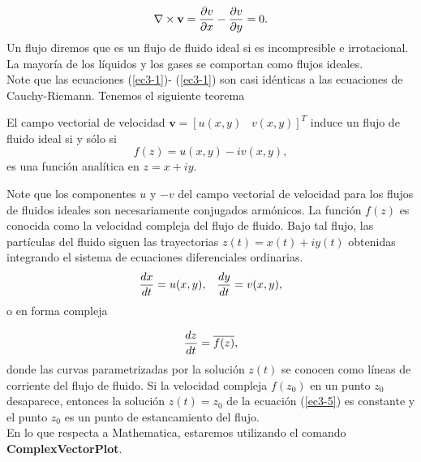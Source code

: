 \begin{equation}\label{ec3-2}
	\nabla \times \textbf{v} =\dfrac{\partial v}{\partial x}-\dfrac{\partial v}{\partial y}=0.
\end{equation}
Un flujo diremos que es un flujo de fluido ideal si es incompresible e irrotacional. La mayoría de los líquidos y los gases se comportan como flujos ideales.\\
Note que las ecuaciones (\ref{ec3-1})- (\ref{ec3-1}) son casi idénticas a las ecuaciones de Cauchy-Riemann. Tenemos el siguiente teorema
\begin{teor}
	El campo vectorial de velocidad $\textbf{v}=[u(x,y)\;\;\; v(x,y)]^{T}$ induce un flujo de fluido ideal si y sólo si
	\begin{equation}\label{ec3-3}
		f(z)=u(x,y)-iv(x,y),
	\end{equation}
	es una función analítica en $z=x+iy$.\endproof
\end{teor}
Note que los componentes $u$ y $-v$ del campo vectorial de velocidad para los flujos de fluidos ideales son necesariamente conjugados armónicos. La función $f(z)$ es conocida como la velocidad compleja del flujo de fluido. Bajo tal flujo, las partículas del fluido siguen las trayectorias $z(t) = x(t)+iy(t)$ obtenidas integrando el sistema de ecuaciones diferenciales ordinarias.
\begin{equation}\label{ec3-4}
	\dfrac{dx}{dt}=u(x,y),\; \; \; \dfrac{dy}{dt}=v(x,y),
\end{equation}
o en forma compleja 

\begin{equation}\label{ec3-5}
	\dfrac{dz}{dt}=\overline{f(z)},
\end{equation}
donde las curvas parametrizadas por la solución $z(t)$ se conocen como líneas de corriente del flujo de fluido. Si la velocidad compleja $f(z_0)$ en un punto $z_0$ desaparece, entonces la solución $z(t) = z_0$ de la ecuación (\ref{ec3-5}) es constante y el punto $z_0$ es un punto de estancamiento del flujo.\\
En lo que respecta a Mathematica, estaremos utilizando el comando \textbf{ComplexVectorPlot}. 

